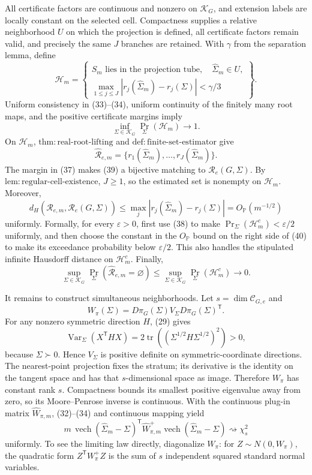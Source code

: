 All certificate factors are continuous and nonzero on \(\mathcal K_G\), and extension labels are locally constant on the selected cell.  Compactness supplies a relative neighborhood \(U\) on which the projection is defined, all certificate factors remain valid, and precisely the same \(J\) branches are retained.  With \(\gamma\) from the separation lemma, define
\[
 \mathcal H_m=\left\{
 \begin{array}{l}
 S_m\text{ lies in the projection tube},\quad \widehat\Sigma_m\in U,\\[2pt]
 \displaystyle\max_{1\leq j\leq J}
 |r_j(\widehat\Sigma_m)-r_j(\Sigma)|<\gamma/3
 \end{array}
 \right\}.
\tag{37}
\]
Uniform consistency in (33)--(34), uniform continuity of the finitely many root maps, and the positive certificate margins imply
\[
 \inf_{\Sigma\in\mathcal K_G}\Pr_\Sigma(\mathcal H_m)\longrightarrow1.
\tag{38}
\]
On \(\mathcal H_m\), \(\mathrm{thm:real\mbox{-}root\mbox{-}lifting}\) and \(\mathrm{def:finite\mbox{-}set\mbox{-}estimator}\) give
\[
 \widehat{\mathcal R}_{e,m}
 =\{r_1(\widehat\Sigma_m),\ldots,r_J(\widehat\Sigma_m)\}.
\tag{39}
\]
The margin in (37) makes (39) a bijective matching to \(\mathcal R_e(G,\Sigma)\).  By \(\mathrm{lem:regular\mbox{-}cell\mbox{-}existence}\), \(J\geq1\), so the estimated set is nonempty on \(\mathcal H_m\).  Moreover,
\[
 d_H(\widehat{\mathcal R}_{e,m},\mathcal R_e(G,\Sigma))
 \leq\max_j|r_j(\widehat\Sigma_m)-r_j(\Sigma)|
 =O_{\mathbb P}(m^{-1/2})
\tag{40}
\]
uniformly.  Formally, for every \(\varepsilon>0\), first use (38) to make \(\Pr_\Sigma(\mathcal H_m^c)<\varepsilon/2\) uniformly, and then choose the constant in the \(O_{\mathbb P}\) bound on the right side of (40) to make its exceedance probability below \(\varepsilon/2\).  This also handles the stipulated infinite Hausdorff distance on \(\mathcal H_m^c\).  Finally,
\[
 \sup_{\Sigma\in\mathcal K_G}
 \Pr_\Sigma(\widehat{\mathcal R}_{e,m}=\varnothing)
 \leq\sup_{\Sigma\in\mathcal K_G}\Pr_\Sigma(\mathcal H_m^c)
 \longrightarrow0.
\tag{41}
\]

It remains to construct simultaneous neighborhoods.  Let \(s=\dim\mathcal C_{G,e}\) and
\[
 W_\pi(\Sigma)=D\pi_G(\Sigma)V_\Sigma D\pi_G(\Sigma)^{\mathsf T}.
\tag{42}
\]
For any nonzero symmetric direction \(H\), (29) gives
\[
 \operatorname{Var}_\Sigma(X^{\mathsf T}HX)
 =2\operatorname{tr}\!\left((\Sigma^{1/2}H\Sigma^{1/2})^2\right)>0,
\tag{43}
\]
because \(\Sigma\succ0\).  Hence \(V_\Sigma\) is positive definite on symmetric-coordinate directions.  The nearest-point projection fixes the stratum; its derivative is the identity on the tangent space and has that \(s\)-dimensional space as image.  Therefore \(W_\pi\) has constant rank \(s\).  Compactness bounds its smallest positive eigenvalue away from zero, so its Moore--Penrose inverse is continuous.  With the continuous plug-in matrix \(\widehat W_{\pi,m}\), (32)--(34) and continuous mapping yield
\[
 m\,\operatorname{vech}(\widehat\Sigma_m-\Sigma)^{\mathsf T}
 \widehat W_{\pi,m}^{+}
 \operatorname{vech}(\widehat\Sigma_m-\Sigma)
 \rightsquigarrow\chi_s^2
\tag{44}
\]
uniformly.  To see the limiting law directly, diagonalize \(W_\pi\): for \(Z\sim N(0,W_\pi)\), the quadratic form \(Z^{\mathsf T}W_\pi^+Z\) is the sum of \(s\) independent squared standard normal variables.

